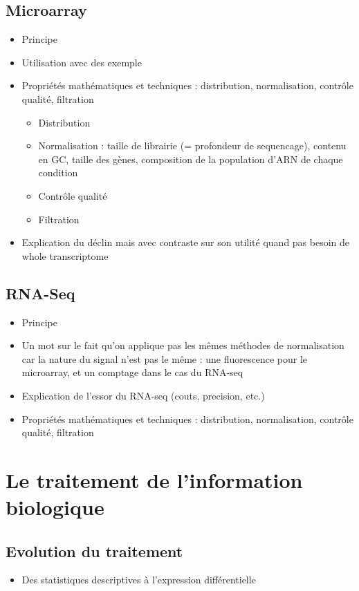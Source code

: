 \subsection{Microarray}
\begin{itemize}
\item Principe
\item Utilisation avec des exemple
\item Propriétés mathématiques et techniques : distribution, normalisation, contrôle qualité, filtration
\begin{itemize}
    \item Distribution
    \item Normalisation : taille de librairie (= profondeur de sequencage), contenu en GC, taille des gènes, composition de la population d'ARN de chaque condition
    \item Contrôle qualité
    \item Filtration
\end{itemize}
\item Explication du déclin mais avec contraste sur son utilité quand pas besoin de whole transcriptome
\end{itemize}

\subsection{RNA-Seq}
\begin{itemize}
\item Principe
\item Un mot sur le fait qu'on applique pas les mêmes méthodes de normalisation car la nature du signal n'est pas le même : une fluorescence pour le microarray, et un comptage dans le cas du RNA-seq
\item Explication de l'essor du RNA-seq (couts, precision, etc.)
\item Propriétés mathématiques et techniques : distribution, normalisation, contrôle qualité, filtration
\end{itemize}

\section{Le traitement de l'information biologique}
\subsection{Evolution du traitement}
\begin{itemize}
\item Des statistiques descriptives à l'expression différentielle
\end{itemize}

